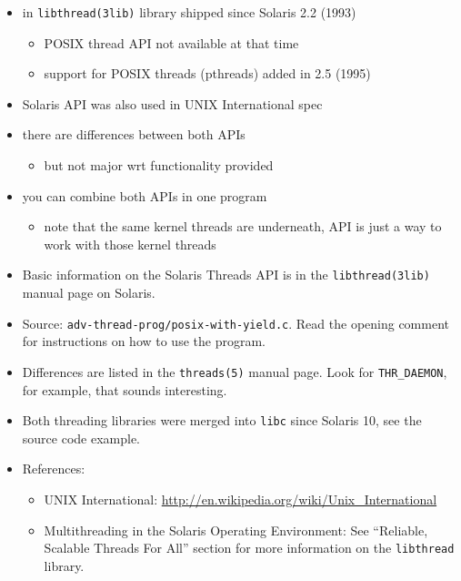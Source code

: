 \begin{itemize}
\item in \texttt{libthread(3lib)} library shipped since Solaris 2.2 (1993)
	\begin{itemize}
	\item POSIX thread API not available at that time
	\item support for POSIX threads (pthreads) added in 2.5 (1995)
	\end{itemize}
\item Solaris API was also used in UNIX International spec
\item there are differences between both APIs
	\begin{itemize}
	\item but not major wrt functionality provided
	\end{itemize}
\item you can combine both APIs in one program
	\begin{itemize}
	\item note that the same kernel threads are underneath, API is just a
	way to work with those kernel threads
	\end{itemize}
\end{itemize}


\begin{itemize}
\item Basic information on the Solaris Threads API is in the
\texttt{libthread(3lib)} manual page on Solaris.
\item \label{THREAD_YIELD} Source: \texttt{adv-thread-prog/posix-with-yield.c}.
Read the opening comment for instructions on how to use the program.
\item Differences are listed in the \texttt{threads(5)} manual page. Look for
\texttt{THR\_DAEMON}, for example, that sounds interesting.
\item Both threading libraries were merged into \texttt{libc} since Solaris 10,
see the source code example.
\item References:
	\begin{itemize}
	\item UNIX International:
	\url{http://en.wikipedia.org/wiki/Unix\_International}
	\item Multithreading in the Solaris Operating Environment:
	See ``Reliable, Scalable Threads For All'' section for more information
        on the \texttt{libthread} library.
	\end{itemize}
\end{itemize}

